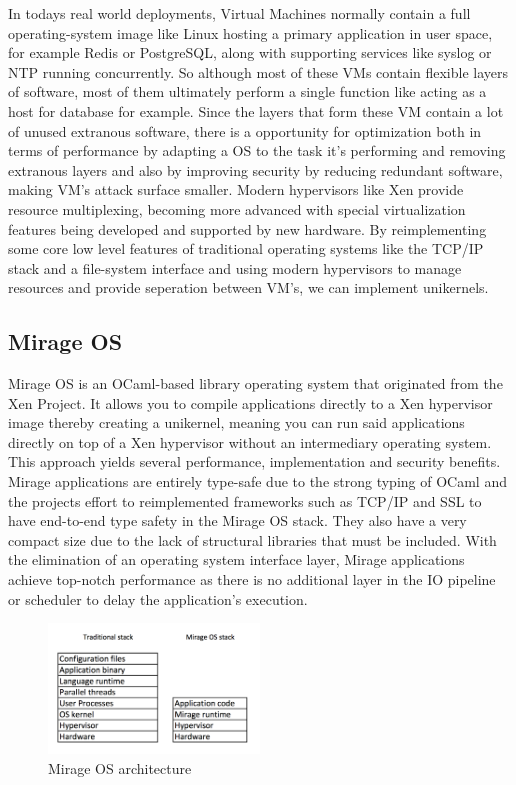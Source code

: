 \documentclass[english,10pt,twocolumn]{article}
\begin{document}
In todays real world deployments, Virtual Machines normally contain a full operating-system image like Linux hosting a primary application in user space, for example Redis or PostgreSQL, along with supporting services like syslog or NTP running concurrently.
So although most of these VMs contain flexible layers of software, most of them ultimately perform a single function like acting as a host for database for example.
Since the layers that form these VM contain a lot of unused extranous software, there is a opportunity for optimization both in terms of performance by adapting a OS to the task it's performing and removing extranous layers and also by improving security by reducing redundant software, making VM's attack surface smaller.
Modern hypervisors like Xen provide resource multiplexing, becoming more advanced with special virtualization features being developed and supported by new hardware.
By reimplementing some core low level features of traditional operating systems like the TCP/IP stack and a file-system interface and using modern hypervisors to manage resources and provide seperation between VM's, we can implement unikernels.

\subsection{Mirage OS}

Mirage OS is an OCaml-based library operating system that originated from the Xen Project.
It allows you to compile applications directly to a Xen hypervisor image thereby creating a unikernel, meaning you can run said applications directly on top of a Xen hypervisor without an intermediary operating system.
This approach yields several performance, implementation and security benefits.
Mirage applications are entirely type-safe due to the strong typing of OCaml and the projects effort to reimplemented frameworks such as TCP/IP and SSL to have end-to-end type safety in the Mirage OS stack.
They also have a very compact size due to the lack of structural libraries that must be included.
With the elimination of an operating system interface layer, Mirage applications achieve top-notch performance as there is no additional layer in the IO pipeline or scheduler to delay the application's execution.

\begin{figure}[ht]
  \centering
  \caption{Mirage OS architecture}
  \includegraphics[width=0.5\textwidth]{images/design}
\end{figure}
\end{document}
